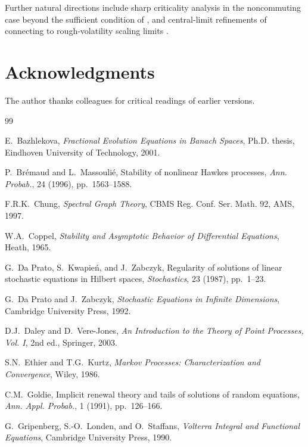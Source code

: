 \documentclass[11pt]{article}
\theoremstyle{plain}
\theoremstyle{definition}
\theoremstyle{remark}
\begin{document}
Further natural directions include sharp criticality analysis in the noncommuting case beyond the
sufficient condition of , and central-limit refinements of 
connecting to rough-volatility scaling limits \cite{jaisson2016}.

\section*{Acknowledgments}
The author thanks colleagues for critical readings of earlier versions.

\begin{thebibliography}{99}

 E.~Bazhlekova,
\emph{Fractional Evolution Equations in Banach Spaces}, Ph.D. thesis,
Eindhoven University of Technology, 2001.

 P.~Br\'emaud and L.~Massouli\'e,
Stability of nonlinear Hawkes processes,
\emph{Ann. Probab.}, 24 (1996), pp.~1563--1588.

 F.R.K.~Chung,
\emph{Spectral Graph Theory}, CBMS Reg. Conf. Ser. Math. 92, AMS, 1997.

 W.A.~Coppel,
\emph{Stability and Asymptotic Behavior of Differential Equations}, Heath, 1965.

 G.~Da Prato, S.~Kwapie\'n, and J.~Zabczyk,
Regularity of solutions of linear stochastic equations in Hilbert spaces,
\emph{Stochastics}, 23 (1987), pp.~1--23.

 G.~Da Prato and J.~Zabczyk,
\emph{Stochastic Equations in Infinite Dimensions}, Cambridge University Press, 1992.

 D.J.~Daley and D.~Vere-Jones,
\emph{An Introduction to the Theory of Point Processes, Vol. I}, 2nd ed., Springer, 2003.

 S.N.~Ethier and T.G.~Kurtz,
\emph{Markov Processes: Characterization and Convergence}, Wiley, 1986.

 C.M.~Goldie,
Implicit renewal theory and tails of solutions of random equations,
\emph{Ann. Appl. Probab.}, 1 (1991), pp.~126--166.

 G.~Gripenberg, S.-O.~Londen, and O.~Staffans,
\emph{Volterra Integral and Functional Equations}, Cambridge University Press, 1990.


\end{thebibliography}
\end{document}
